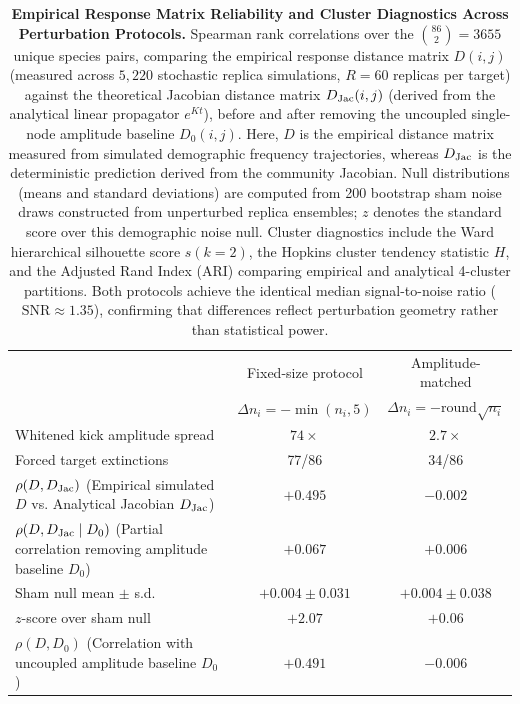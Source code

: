 \begin{table}[t]
\caption{\label{tab:reliability}\textbf{Empirical Response Matrix Reliability and Cluster Diagnostics Across Perturbation Protocols.}
Spearman rank correlations over the $\binom{86}{2}=3655$ unique species pairs, comparing the empirical response distance matrix $D(i,j)$ (measured across $5{,}220$ stochastic replica simulations, $R=60$ replicas per target) against the theoretical Jacobian distance matrix $D_{\rm Jac}(i,j)$ (derived from the analytical linear propagator $e^{Kt}$), before and after removing the uncoupled single-node amplitude baseline $D_0(i,j)$.
Here, $D$ is the empirical distance matrix measured from simulated demographic frequency trajectories, whereas $D_{\rm Jac}$ is the deterministic prediction derived from the community Jacobian.
Null distributions (means and standard deviations) are computed from 200 bootstrap sham noise draws constructed from unperturbed replica ensembles; $z$ denotes the standard score over this demographic noise null.
Cluster diagnostics include the Ward hierarchical silhouette score $s(k=2)$, the Hopkins cluster tendency statistic $H$, and the Adjusted Rand Index (ARI) comparing empirical and analytical 4-cluster partitions.
Both protocols achieve the identical median signal-to-noise ratio ($\mathrm{SNR} \approx 1.35$), confirming that differences reflect perturbation geometry rather than statistical power.}
\begin{ruledtabular}
\begin{tabular}{lcc}
 & Fixed-size protocol & Amplitude-matched \\
 & $\Delta n_i=-\min(n_i,5)$ & $\Delta n_i=-\mathrm{round}\sqrt{n_i}$ \\ \hline
Whitened kick amplitude spread & $74\times$ & $2.7\times$ \\
Forced target extinctions & 77/86 & 34/86 \\ \hline
$\rho(D,D_{\rm Jac})$ (Empirical simulated $D$ vs. Analytical Jacobian $D_{\rm Jac}$) & $+0.495$ & $-0.002$ \\
$\rho(D,D_{\rm Jac} \mid D_0)$ (Partial correlation removing amplitude baseline $D_0$) & $+0.067$ & $+0.006$ \\
\quad Sham null mean $\pm$ s.d. & $+0.004\pm0.031$ & $+0.004\pm0.038$ \\
\quad $z$-score over sham null & $+2.07$ & $+0.06$ \\ \hline
$\rho(D,D_0)$ (Correlation with uncoupled amplitude baseline $D_0$) & $+0.491$ & $-0.006$ \\

\end{tabular}
\end{ruledtabular}
\end{table}
